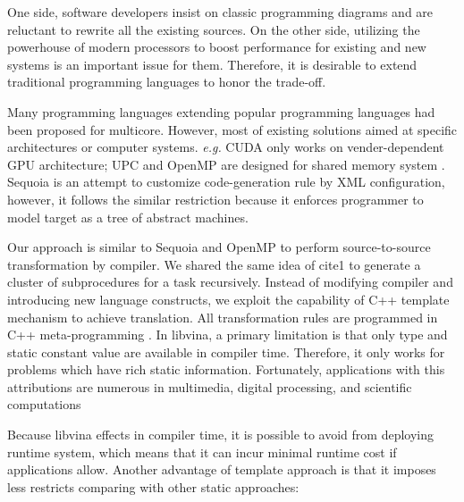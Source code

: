 \documentclass[10pt, conference, compsocconf]{IEEEtran}
\begin{document}
One side, software developers insist on classic programming diagrams and are reluctant to rewrite all the existing sources. On the other side, utilizing the powerhouse of modern processors to boost performance for existing and new systems is an important issue for them. Therefore, it is desirable to extend traditional programming languages to honor the trade-off.

Many programming languages extending popular programming languages had been proposed for multicore. However, most of existing solutions aimed at specific architectures or computer systems. \textit{e.g.} CUDA only works on vender-dependent GPU architecture; UPC and OpenMP are designed for shared memory system \cite{b15}. Sequoia \cite{b1} is an attempt to customize code-generation rule by XML configuration, however, it follows the similar restriction because it enforces programmer to model target as a tree of abstract machines.

Our approach is similar to Sequoia and OpenMP to perform source-to-source transformation by compiler. We shared the same idea of cite{1} to generate a cluster of subprocedures for a task recursively. Instead of modifying compiler and introducing new language constructs, we exploit the capability of C++ template mechanism to achieve translation. All transformation rules are programmed in C++ meta-programming \cite{b10}.  In libvina, a primary limitation is that only type and static constant value are available in compiler time. Therefore, it only works for problems which have rich static information. Fortunately, applications with this attributions are numerous in multimedia, digital processing, and scientific computations 

Because libvina effects in compiler time, it is possible to avoid from deploying runtime system, which means that it can incur minimal runtime cost if applications allow. Another advantage of template approach is that it imposes less restricts comparing with other static approaches:
\end{document}
